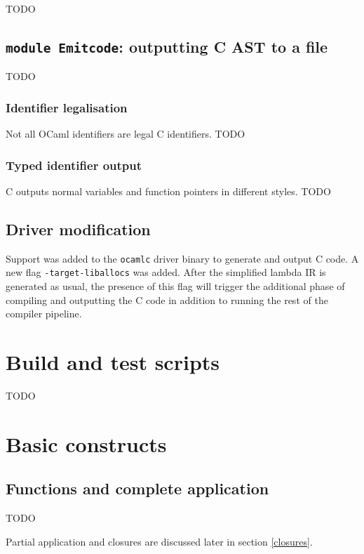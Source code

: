 \documentclass[12pt,a4paper,twoside,openright]{report}
\begin{document}
TODO

\subsection{\texttt{module Emitcode}: outputting C AST to a file}\label{emitcode}

TODO

\subsubsection{Identifier legalisation}

Not all OCaml identifiers are legal C identifiers. TODO

\subsubsection{Typed identifier output}

C outputs normal variables and function pointers in different styles. TODO

\subsection{Driver modification}

Support was added to the \lstinline!ocamlc! driver binary to generate and
output C code. A new flag \lstinline!-target-liballocs! was added. After the
simplified lambda IR is generated as usual, the presence of this flag will
trigger the additional phase of compiling and outputting the C code in addition
to running the rest of the compiler pipeline.

\section{Build and test scripts}

TODO


\section{Basic constructs}

\subsection{Functions and complete application}\label{functions}

TODO

Partial application and closures are discussed later in section \ref{closures}.
\end{document}
